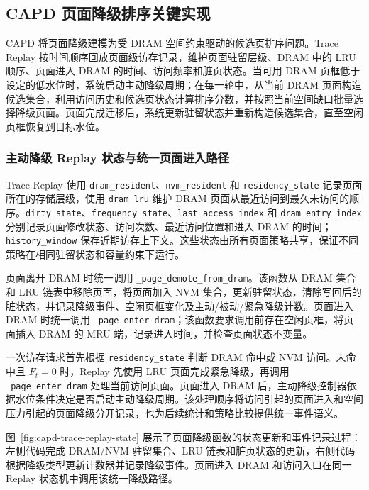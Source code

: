 
\subsection{\heiti CAPD 页面降级排序关键实现}

CAPD 将页面降级建模为受 DRAM 空间约束驱动的候选页排序问题。Trace Replay 按时间顺序回放页面级访存记录，维护页面驻留层级、DRAM 中的 LRU 顺序、页面进入 DRAM 的时间、访问频率和脏页状态。当可用 DRAM 页框低于设定的低水位时，系统启动主动降级周期；在每一轮中，从当前 DRAM 页面构造候选集合，利用访问历史和候选页状态计算排序分数，并按照当前空间缺口批量选择降级页面。页面完成迁移后，系统更新驻留状态并重新构造候选集合，直至空闲页框恢复到目标水位。

\subsubsection{\heiti 主动降级 Replay 状态与统一页面进入路径}

Trace Replay 使用 \texttt{dram\_resident}、\texttt{nvm\_resident} 和 \texttt{residency\_state} 记录页面所在的存储层级，使用 \texttt{dram\_lru} 维护 DRAM 页面从最近访问到最久未访问的顺序。\texttt{dirty\_state}、\texttt{frequency\_state}、\texttt{last\_access\_index} 和 \texttt{dram\_entry\_index} 分别记录页面修改状态、访问次数、最近访问位置和进入 DRAM 的时间；\texttt{history\_window} 保存近期访存上下文。这些状态由所有页面策略共享，保证不同策略在相同驻留状态和容量约束下运行。

页面离开 DRAM 时统一调用 \texttt{\_page\_demote\_from\_dram}。该函数从 DRAM 集合和 LRU 链表中移除页面，将页面加入 NVM 集合，更新驻留状态，清除写回后的脏状态，并记录降级事件、空闲页框变化及主动/被动/紧急降级计数。页面进入 DRAM 时统一调用 \texttt{\_page\_enter\_dram}；该函数要求调用前存在空闲页框，将页面插入 DRAM 的 MRU 端，记录进入时间，并检查页面状态不变量。

一次访存请求首先根据 \texttt{residency\_state} 判断 DRAM 命中或 NVM 访问。未命中且 $F_t=0$ 时，Replay 先使用 LRU 页面完成紧急降级，再调用 \texttt{\_page\_enter\_dram} 处理当前访问页面。页面进入 DRAM 后，主动降级控制器依据水位条件决定是否启动主动降级周期。该处理顺序将访问引起的页面进入和空间压力引起的页面降级分开记录，也为后续统计和策略比较提供统一事件语义。

图~\ref{fig:capd-trace-replay-state} 展示了页面降级函数的状态更新和事件记录过程：左侧代码完成 DRAM/NVM 驻留集合、LRU 链表和脏页状态的更新，右侧代码根据降级类型更新计数器并记录降级事件。页面进入 DRAM 和访问入口在同一 Replay 状态机中调用该统一降级路径。

